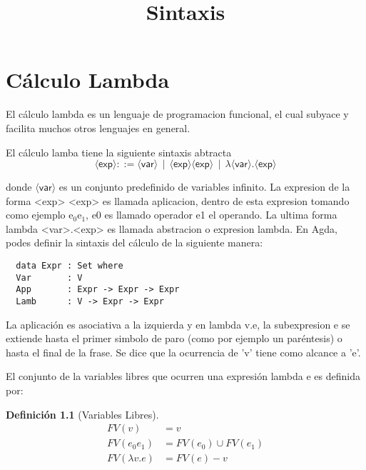 \documentclass{book}
\newcommand{\expr}{\langle \mathsf{exp} \rangle}
\newcommand{\var}{\langle \mathsf{var} \rangle}
\newtheorem{definition}{Definición}
\begin{document}
\chapter{Cálculo Lambda}
\label{chap:lambda}

El cálculo lambda es un lenguaje de programacion funcional, el cual subyace y facilita muchos otros lenguajes en general.

\title{Sintaxis}
\maketitle

El cálculo lamba tiene la siguiente sintaxis abtracta \\

\[
\expr ::= \var\,\mid\, \expr \expr \,\mid\, \lambda \var.\expr
\]

donde \( \var \) es un conjunto predefinido de variables infinito. La expresion de la forma <exp> <exp> es llamada aplicacion, dentro de esta expresion tomando como ejemplo e$_{0}$e$_{1}$, e0 es llamado operador e1 el operando. La ultima forma lambda <var>.<exp> es llamada abstracion o expresion lambda.
En Agda, podes definir la sintaxis del cálculo de la siguiente manera: \\

\begin{lstlisting}
  data Expr : Set where
  Var       : V
  App       : Expr -> Expr -> Expr
  Lamb      : V -> Expr -> Expr
\end{lstlisting}
                             
La aplicación es asociativa a la izquierda y en lambda v.e, la subexpresion e se extiende hasta el primer simbolo de paro (como por ejemplo un paréntesis) o hasta el final de la frase. Se dice que la ocurrencia de 'v' tiene como alcance a 'e'.

El conjunto de la variables libres que ocurren una expresión lambda e es definida por: \\


\begin{definition}[Variables Libres]
  \begin{align*}\label{eq:1}
    FV(v) &= {v} \\
    FV(e_{0}e_{1}) &= FV(e_{0}) \cup FV(e_{1}) \\
    FV(\lambda v.e) &= FV(e) - {v} \\
  \end{align*}
\end{definition}
\end{document}
